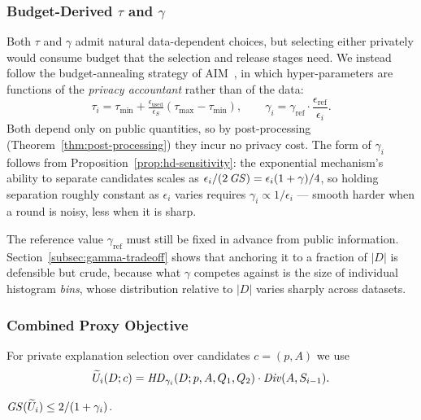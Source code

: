 \subsubsection{Budget-Derived $\tau$ and $\gamma$}
\label{subsubsec:adaptive-params}

Both $\tau$ and $\gamma$ admit natural data-dependent choices, but selecting either privately would consume budget that the selection and release stages need.
We instead follow the budget-annealing strategy of AIM~\cite{McKennaMSM22}, in which hyper-parameters are functions of the \emph{privacy accountant} rather than of the data:
\begin{equation}
\tau_i=\tau_{\min}+\tfrac{\epsilon_{\text{used}}}{\epsilon_S}\left(\tau_{\max}-\tau_{\min}\right),
\qquad
\gamma_i=\gamma_{\text{ref}}\cdot\frac{\epsilon_{\text{ref}}}{\epsilon_i}.
\label{eq:adaptive-params}
\end{equation}
Both depend only on public quantities, so by post-processing (Theorem~\ref{thm:post-processing}) they incur no privacy cost.
The form of $\gamma_i$ follows from Proposition~\ref{prop:hd-sensitivity}: the exponential mechanism's ability to separate candidates scales as $\epsilon_i/(2\,\mathit{GS})=\epsilon_i(1+\gamma)/4$, so holding separation roughly constant as $\epsilon_i$ varies requires $\gamma_i\propto 1/\epsilon_i$ --- smooth harder when a round is noisy, less when it is sharp.

The reference value $\gamma_{\text{ref}}$ must still be fixed in advance from public information.
Section~\ref{subsec:gamma-tradeoff} shows that anchoring it to a fraction of $|D|$ is defensible but crude, because what $\gamma$ competes against is the size of individual histogram \emph{bins}, whose distribution relative to $|D|$ varies sharply across datasets.

\subsubsection{Combined Proxy Objective}
\label{subsubsec:combined-proxy-objective}

For private explanation selection over candidates $c=(p,A)$ we use
\begin{equation}
\widetilde{U}_i(D;c)=\mathit{HD}_{\gamma_i}(D;p,A,Q_1,Q_2)\cdot \mathit{Div}(A,S_{i-1}).
\label{eq:selection-utility}
\end{equation}

\begin{proposition}
\label{prop:selection-utility-sensitivity}
$\mathit{GS}(\widetilde{U}_i)\le 2/(1+\gamma_i)$.
\end{proposition}

